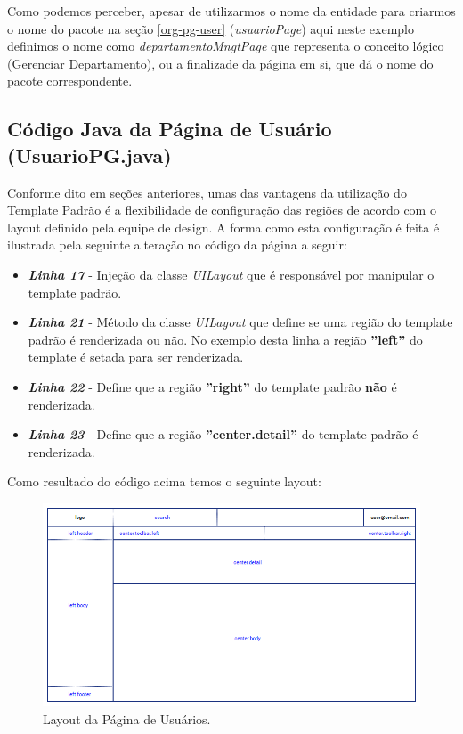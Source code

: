 \documentclass[a4paper,10pt]{article}
\begin{document}
Como podemos perceber, apesar de utilizarmos o nome da entidade para criarmos o
nome do pacote na seção \ref{org-pg-user} (\emph{usuarioPage}) aqui neste
exemplo definimos o nome como \emph{departamentoMngtPage} que representa  o
conceito lógico (Gerenciar Departamento), ou a finalizade da página em si, que
dá o nome do pacote correspondente.
% 
%
\subsection{Código Java da Página de Usuário (UsuarioPG.java)}
Conforme dito em seções anteriores, umas das vantagens da utilização do Template
Padrão é a flexibilidade de configuração das regiões de acordo com o layout
definido pela equipe de design. A forma como esta configuração é feita é
ilustrada pela seguinte alteração no código da página a seguir:
	
		\begin{itemize}
		  \item \textbf{\emph{Linha 17}} - Injeção da classe \emph{UILayout} que é
		  responsável por manipular o template padrão.
		  \item \textbf{\emph{Linha 21}} - Método da classe \emph{UILayout} que define
		  se uma região do template padrão é renderizada ou não. No exemplo desta
		  linha a região \textbf{''left''} do template é setada para ser renderizada. 
		  \item \textbf{\emph{Linha 22}} - Define que a região \textbf{''right''} do
		  template padrão \textbf{não} é renderizada.
		  \item \textbf{\emph{Linha 23}} - Define que a região
		  \textbf{''center.detail''} do template padrão é renderizada.
		\end{itemize}

Como resultado do código acima temos o seguinte layout:
	\begin{figure}[h]
		\centering
	 	\includegraphics[scale=.6]{images/layoutUsuarioPage.png} 
	 	\caption{Layout da Página de Usuários.}
	\end{figure} 
% 
%
\newpage
\end{document}
